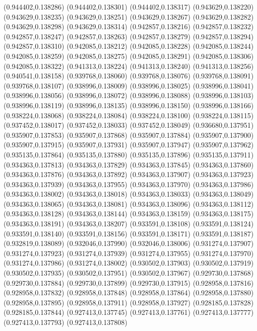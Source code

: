 (0.944402,0.138286)
(0.944402,0.138301)
(0.944402,0.138317)
(0.943629,0.138220)
(0.943629,0.138235)
(0.943629,0.138251)
(0.943629,0.138267)
(0.943629,0.138282)
(0.943629,0.138298)
(0.943629,0.138314)
(0.942857,0.138216)
(0.942857,0.138232)
(0.942857,0.138247)
(0.942857,0.138263)
(0.942857,0.138279)
(0.942857,0.138294)
(0.942857,0.138310)
(0.942085,0.138212)
(0.942085,0.138228)
(0.942085,0.138244)
(0.942085,0.138259)
(0.942085,0.138275)
(0.942085,0.138291)
(0.942085,0.138306)
(0.942085,0.138322)
(0.941313,0.138224)
(0.941313,0.138240)
(0.941313,0.138256)
(0.940541,0.138158)
(0.939768,0.138060)
(0.939768,0.138076)
(0.939768,0.138091)
(0.939768,0.138107)
(0.938996,0.138009)
(0.938996,0.138025)
(0.938996,0.138041)
(0.938996,0.138056)
(0.938996,0.138072)
(0.938996,0.138088)
(0.938996,0.138103)
(0.938996,0.138119)
(0.938996,0.138135)
(0.938996,0.138150)
(0.938996,0.138166)
(0.938224,0.138068)
(0.938224,0.138084)
(0.938224,0.138100)
(0.938224,0.138115)
(0.937452,0.138017)
(0.937452,0.138033)
(0.937452,0.138049)
(0.936680,0.137951)
(0.935907,0.137853)
(0.935907,0.137868)
(0.935907,0.137884)
(0.935907,0.137900)
(0.935907,0.137915)
(0.935907,0.137931)
(0.935907,0.137947)
(0.935907,0.137962)
(0.935135,0.137864)
(0.935135,0.137880)
(0.935135,0.137896)
(0.935135,0.137911)
(0.934363,0.137813)
(0.934363,0.137829)
(0.934363,0.137845)
(0.934363,0.137860)
(0.934363,0.137876)
(0.934363,0.137892)
(0.934363,0.137907)
(0.934363,0.137923)
(0.934363,0.137939)
(0.934363,0.137955)
(0.934363,0.137970)
(0.934363,0.137986)
(0.934363,0.138002)
(0.934363,0.138018)
(0.934363,0.138033)
(0.934363,0.138049)
(0.934363,0.138065)
(0.934363,0.138081)
(0.934363,0.138096)
(0.934363,0.138112)
(0.934363,0.138128)
(0.934363,0.138144)
(0.934363,0.138159)
(0.934363,0.138175)
(0.934363,0.138191)
(0.934363,0.138207)
(0.933591,0.138108)
(0.933591,0.138124)
(0.933591,0.138140)
(0.933591,0.138156)
(0.933591,0.138171)
(0.933591,0.138187)
(0.932819,0.138089)
(0.932046,0.137990)
(0.932046,0.138006)
(0.931274,0.137907)
(0.931274,0.137923)
(0.931274,0.137939)
(0.931274,0.137955)
(0.931274,0.137970)
(0.931274,0.137986)
(0.931274,0.138002)
(0.930502,0.137903)
(0.930502,0.137919)
(0.930502,0.137935)
(0.930502,0.137951)
(0.930502,0.137967)
(0.929730,0.137868)
(0.929730,0.137884)
(0.929730,0.137899)
(0.929730,0.137915)
(0.928958,0.137816)
(0.928958,0.137832)
(0.928958,0.137848)
(0.928958,0.137864)
(0.928958,0.137880)
(0.928958,0.137895)
(0.928958,0.137911)
(0.928958,0.137927)
(0.928185,0.137828)
(0.928185,0.137844)
(0.927413,0.137745)
(0.927413,0.137761)
(0.927413,0.137777)
(0.927413,0.137793)
(0.927413,0.137808)
